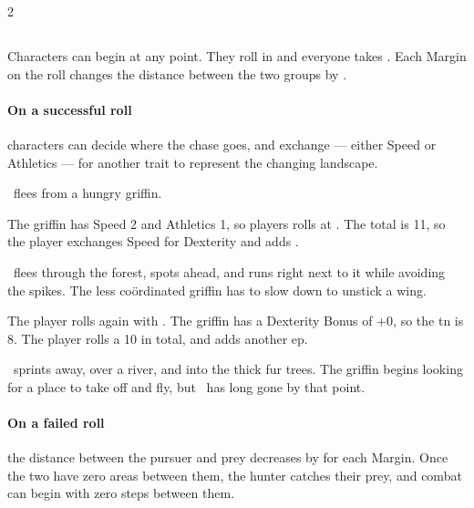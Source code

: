 \begin{multicols}{2}
\stopcontents[Manoeuvres]

\subsection{}
\label{chases}

Characters can begin  at any point.
They roll  in  and everyone takes .
Each Margin on the roll changes the distance between the two groups by .

\paragraph{On a successful roll}
characters can decide where the chase goes, and exchange  --- either Speed or Athletics --- for another \gls{trait} to represent the changing landscape.

\begin{exampletext}
  \composeHumanName\ flees from a hungry \gls{griffin}.

  {\sffamily The \gls{griffin} has Speed 2 and Athletics 1, so players rolls  at \tn[10].
  The total is 11, so the player exchanges Speed for Dexterity and adds .}

  \currentName\ flees through the forest, spots  ahead, and runs right next to it while avoiding the spikes.
  The less co\"ordinated \gls{griffin} has to slow down to unstick a wing.

  {\sffamily The player rolls again with .
  The \gls{griffin} has a Dexterity Bonus of +0, so the \gls{tn} is 8.
  The player rolls a 10 in total, and adds another \gls{ep}.}

  \currentName\ sprints away, over a river, and into the thick fur trees.
  The \gls{griffin} begins looking for a place to take off and fly, but \currentName\ has long gone by that point.
\end{exampletext}

\paragraph{On a failed roll}
the distance between the pursuer and prey decreases by  for each Margin.
Once the two have zero \glspl{area} between them, the hunter catches their prey, and combat can begin with zero \glspl{step} between them.


\end{multicols}
